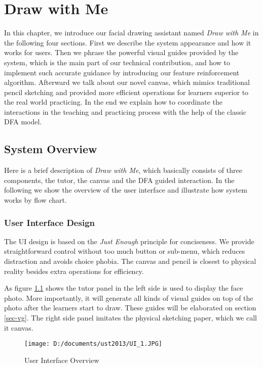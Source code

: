 \chapter{Draw with Me} \label{sec-mainwork}

		In this chapter, we introduce our facial drawing assistant named \textit{Draw with Me} in the following four sections. First we describe the system appearance and how it works for users. Then we phrase the powerful visual guides provided by the system, which is the main part of our technical contribution, and how to implement such accurate guidance by introducing our feature reinforcement algorithm. Afterward we talk about our novel canvas, which mimics traditional pencil sketching and provided more efficient operations for learners superior to the real world practicing. In the end we explain how to coordinate the interactions in the teaching and practicing process with the help of the classic DFA model.

\section{System Overview}

		Here is a brief description of \textit{Draw with Me}, which basically consists of three components, the tutor, the canvas and the DFA guided interaction. In the following we show the overview of the user interface and illustrate how system works by flow chart.
	
		\subsection{User Interface Design}
		
			The UI design is based on the \textit{Just Enough} principle for conciseness. We provide straightforward control without too much button or sub-menu, which reduces distraction and avoids choice phobia. The canvas and pencil is closest to physical reality besides extra operations for efficiency.
			
			As figure \ref{fig:UI} shows the tutor panel in the left side is used to display the face photo. More importantly, it will generate all kinds of visual guides on top of the photo after the learners start to draw. These guides will be elaborated on section \ref{sec-vg}. The right side panel imitates the physical sketching paper, which we call it canvas. 
		\begin{figure}[htbp]
			\centering
				\texttt{[image: D:/documents/ust2013/UI\_1.JPG]}
			\caption{User Interface Overview}
			\label{fig:UI}
		\end{figure}
			
